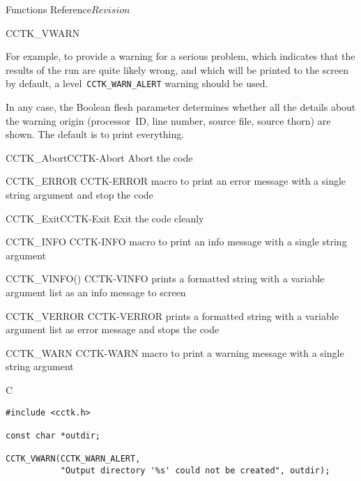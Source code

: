 \begin{cactuspart}{ Functions Reference}{}{$Revision$}
\begin{FunctionDescription}{CCTK\_VWARN}
\begin{Discussion}
For example, to provide a warning for a serious problem, which
indicates that the results of the run are quite likely wrong,
and which will be printed to the screen by default,
a level~\verb|CCTK_WARN_ALERT| warning should be used.

In any case, the Boolean flesh parameter 
determines whether all the details about the warning origin (processor~ID,
line number, source file, source thorn) are shown. The default is to
print everything.
\end{Discussion}

\begin{SeeAlsoSection}
\begin{SeeAlso2}{CCTK\_Abort}{CCTK-Abort}
Abort the code
\end{SeeAlso2}
\begin{SeeAlso2} {CCTK\_ERROR} {CCTK-ERROR}
macro to print an error message with a single string argument and stop
the code
\end{SeeAlso2}
\begin{SeeAlso2}{CCTK\_Exit}{CCTK-Exit}
Exit the code cleanly
\end{SeeAlso2}
\begin{SeeAlso2} {CCTK\_INFO} {CCTK-INFO}
macro to print an info message with a single string argument
\end{SeeAlso2}
\begin{SeeAlso2} {CCTK\_VINFO()} {CCTK-VINFO}
prints a formatted string with a variable argument list as an info message to
screen
\end{SeeAlso2}
\begin{SeeAlso2} {CCTK\_VERROR} {CCTK-VERROR}
prints a formatted string with a variable argument list as error
message and stops the code
\end{SeeAlso2}
\begin{SeeAlso2} {CCTK\_WARN} {CCTK-WARN}
macro to print a warning message with a single string argument
\end{SeeAlso2}
\end{SeeAlsoSection}

\begin{ExampleSection}
\begin{Example}{C}
\begin{verbatim}
#include <cctk.h>

const char *outdir;

CCTK_VWARN(CCTK_WARN_ALERT,
           "Output directory '%s' could not be created", outdir);
\end{verbatim}
\end{Example}
\end{ExampleSection}
\end{FunctionDescription}



\end{cactuspart}
